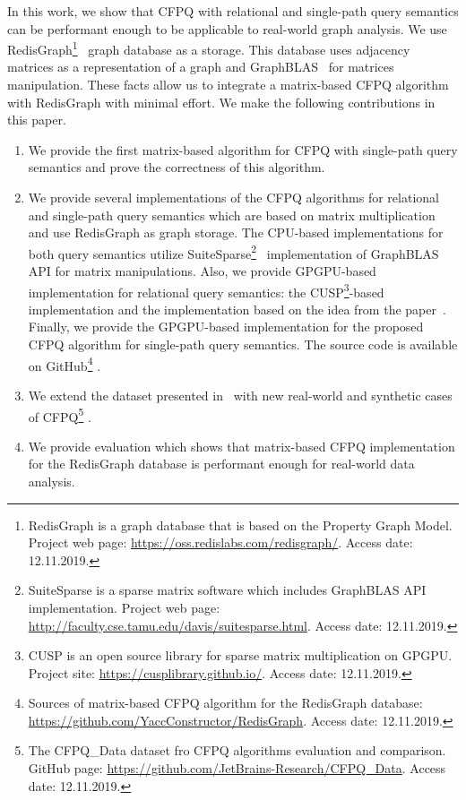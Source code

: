 In this work, we show that CFPQ with relational and single-path query semantics can be performant enough to be applicable to real-world graph analysis.
We use RedisGraph\footnote{RedisGraph is a graph database that is based on the Property Graph Model. Project web page: \url{https://oss.redislabs.com/redisgraph/}. Access date: 12.11.2019.}~\cite{8778293} graph database as a storage.
This database uses adjacency matrices as a representation of a graph and GraphBLAS~\cite{7761646} for matrices manipulation.
These facts allow us to integrate a matrix-based CFPQ algorithm with RedisGraph with minimal effort.
We make the following contributions in this paper.
\begin{enumerate}
\item We provide the first matrix-based algorithm for CFPQ with single-path query semantics and prove the correctness of this algorithm.
\item We provide several implementations of the CFPQ algorithms for relational and single-path query semantics which are based on matrix multiplication and use RedisGraph as graph storage.
The CPU-based implementations for both query semantics utilize SuiteSparse\footnote{SuiteSparse is a sparse matrix software which includes GraphBLAS API implementation. Project web page: \url{http://faculty.cse.tamu.edu/davis/suitesparse.html}. Access date: 12.11.2019.}~\cite{Davis2018Algorithm9S} implementation of GraphBLAS API for matrix manipulations.
Also, we provide GPGPU-based implementation for relational query semantics: the CUSP\footnote{CUSP is an open source library for sparse matrix multiplication on GPGPU. Project site: \url{https://cusplibrary.github.io/}. Access date: 12.11.2019.}-based implementation and the implementation based on the idea from the paper~\cite{NsparsePaper}. Finally, we provide the GPGPU-based implementation for the proposed CFPQ algorithm for single-path query semantics. 
The source code is available on GitHub\footnote{Sources of matrix-based CFPQ algorithm for the RedisGraph database: \url{https://github.com/YaccConstructor/RedisGraph}. Access date: 12.11.2019.}
.
\item We extend the dataset presented in~\cite{Mishin:2019:ECP:3327964.3328503} with new real-world and synthetic cases of CFPQ\footnote{The CFPQ\_Data dataset fro CFPQ algorithms evaluation and comparison. GitHub page: \url{https://github.com/JetBrains-Research/CFPQ_Data}. Access date: 12.11.2019.}
.
\item We provide evaluation which shows that matrix-based CFPQ implementation for the RedisGraph database is performant enough for real-world data analysis.
\end{enumerate}
